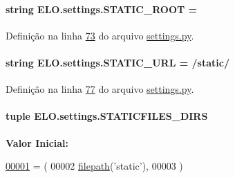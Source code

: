 \paragraph[{S\+T\+A\+T\+I\+C\+\_\+\+R\+O\+O\+T}]{\setlength{\rightskip}{0pt plus 5cm}string E\+L\+O.\+settings.\+S\+T\+A\+T\+I\+C\+\_\+\+R\+O\+O\+T = \textquotesingle{}\textquotesingle{}}\label{namespaceELO_1_1settings_ae5539527ada0171fc602c561493398f4}


Definição na linha \hyperlink{settings_8py_source_l00073}{73} do arquivo \hyperlink{settings_8py_source}{settings.\+py}.

\hypertarget{namespaceELO_1_1settings_a408323f388e22737eedf90471a3809a4}{}
\paragraph[{S\+T\+A\+T\+I\+C\+\_\+\+U\+R\+L}]{\setlength{\rightskip}{0pt plus 5cm}string E\+L\+O.\+settings.\+S\+T\+A\+T\+I\+C\+\_\+\+U\+R\+L = \textquotesingle{}/static/\textquotesingle{}}\label{namespaceELO_1_1settings_a408323f388e22737eedf90471a3809a4}


Definição na linha \hyperlink{settings_8py_source_l00077}{77} do arquivo \hyperlink{settings_8py_source}{settings.\+py}.

\hypertarget{namespaceELO_1_1settings_aa2272e7a822b45c2101e4f5a958e22a6}{}
\paragraph[{S\+T\+A\+T\+I\+C\+F\+I\+L\+E\+S\+\_\+\+D\+I\+R\+S}]{\setlength{\rightskip}{0pt plus 5cm}tuple E\+L\+O.\+settings.\+S\+T\+A\+T\+I\+C\+F\+I\+L\+E\+S\+\_\+\+D\+I\+R\+S}\label{namespaceELO_1_1settings_aa2272e7a822b45c2101e4f5a958e22a6}
{\bfseries Valor Inicial\+:}
\begin{DoxyCode}
\hypertarget{namespaceELO_1_1settings_l00001}{}\hyperlink{namespaceELO_1_1settings}{00001} = (
00002     \hyperlink{namespaceELO_1_1settings_a7730264ddd478343e0f282f36d4a5ab4}{filepath}(\textcolor{stringliteral}{'static'}),
00003 )
\end{DoxyCode}



